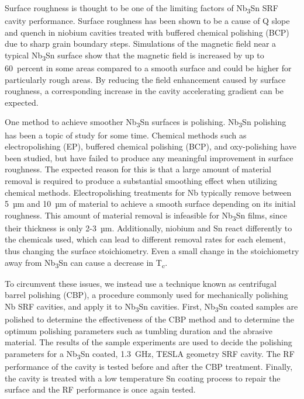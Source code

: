 Surface roughness is thought to be one of the limiting factors of Nb\textsubscript{3}Sn SRF cavity performance. Surface roughness has been shown to be a cause of Q slope and quench in niobium cavities treated with buffered chemical polishing (BCP) due to sharp grain boundary steps.\cite{knobloch1999high, xu2016simulation} Simulations of the magnetic field near a typical Nb\textsubscript{3}Sn surface show that the magnetic field is increased by up to 60~percent in some areas compared to a smooth surface\cite{porter2016surface, kubo2015magnetic} and could be higher for particularly rough areas. By reducing the field enhancement caused by surface roughness, a corresponding increase in the cavity accelerating gradient can be expected. 

One method to achieve smoother Nb\textsubscript{3}Sn surfaces is polishing. Nb\textsubscript{3}Sn polishing has been a topic of study for some time. Chemical methods such as electropolishing (EP)\cite{pudasaini2018studies,pudasaini2017post,hu2019reducing}, buffered chemical polishing (BCP)\cite{pudasaini2017post,hu2019reducing}, and oxy-polishing\cite{pudasaini2017post,pudasaini2018studies} have been studied, but have failed to produce any meaningful improvement in surface roughness. The expected reason for this is that a large amount of material removal is required to produce a substantial smoothing effect when utilizing chemical methods. Electropolishing treatments for Nb typically remove between 5~µm and 10~µm of material to achieve a smooth surface depending on its initial roughness. This amount of material removal is infeasible for Nb\textsubscript{3}Sn films, since their thickness is only 2-3~µm. Additionally, niobium and Sn react differently to the chemicals used, which can lead to different removal rates for each element, thus changing the surface stoichiometry. Even a small change in the stoichiometry away from Nb\textsubscript{3}Sn can cause a decrease in T\textsubscript{c}\cite{sitaraman2021effect}.

To circumvent these issues, we instead use a technique known as centrifugal barrel polishing (CBP), a procedure commonly used for mechanically polishing Nb SRF cavities, and apply it to Nb\textsubscript{3}Sn cavities. First, Nb\textsubscript{3}Sn coated samples are polished to determine the effectiveness of the CBP method and to determine the optimum polishing parameters such as tumbling duration and the abrasive material. The results of the sample experiments are used to decide the polishing parameters for a Nb\textsubscript{3}Sn coated, 1.3~GHz, TESLA geometry SRF cavity. The RF performance of the cavity is tested before and after the CBP treatment. Finally, the cavity is treated with a low temperature Sn coating process to repair the surface and the RF performance is once again tested.

